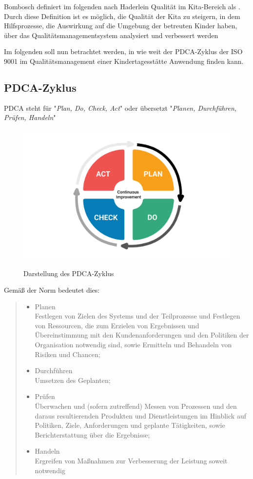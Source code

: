 Bombosch definiert im folgenden nach Haderlein Qualität im Kita-Bereich als  \citep[][198]{KitaMana}. Durch diese Definition ist es möglich, die Qualität der Kita zu steigern, in dem Hilfsprozesse, die Auswirkung auf die Umgebung der betreuten Kinder haben, über das Qualitätsmanagementsystem analysiert und verbessert werden

Im folgenden soll nun betrachtet werden, in wie weit der PDCA-Zyklus der ISO 9001 im Qualitätsmanagement einer Kindertagesstätte Anwendung finden kann.

\subsection{PDCA-Zyklus}
PDCA steht für "{}\textit{Plan, Do, Check, Act}"{} oder übersetzt "{}\textit{Planen, Durchführen, Prüfen, Handeln}"{} \citep[vgl.][9]{ISO9001}
\begin{figure}[h]
\includegraphics[width=1.0\textwidth]{res/pdca.png}\\
\caption{Darstellung des PDCA-Zyklus \citep[][]{pdca}}
\end{figure}
Gemäß der Norm bedeutet dies:

\blockquote{\begin{itemize}
		\item Planen \\
			Festlegen von Zielen des Systems und der Teilprozesse und Festlegen von Ressourcen, die zum Erzielen von Ergebnissen und Übereinstimmung mit den Kundenanforderungen und den Politiken der Organisation notwendig sind, sowie Ermitteln und Behandeln von Risiken und Chancen;
		\item Durchführen\\
			Umsetzen des Geplanten;
		\item Prüfen\\
			Überwachen und (sofern zutreffend) Messen von Prozessen und den daraus resultierenden Produkten und Dienstleistungen im Hinblick auf Politiken, Ziele, Anforderungen und geplante Tätigkeiten, sowie Berichterstattung über die Ergebnisse;
		\item Handeln\\
			Ergreifen von Maßnahmen zur Verbesserung der Leistung soweit notwendig
	\end{itemize}}\citep[][14]{ISO9001}

